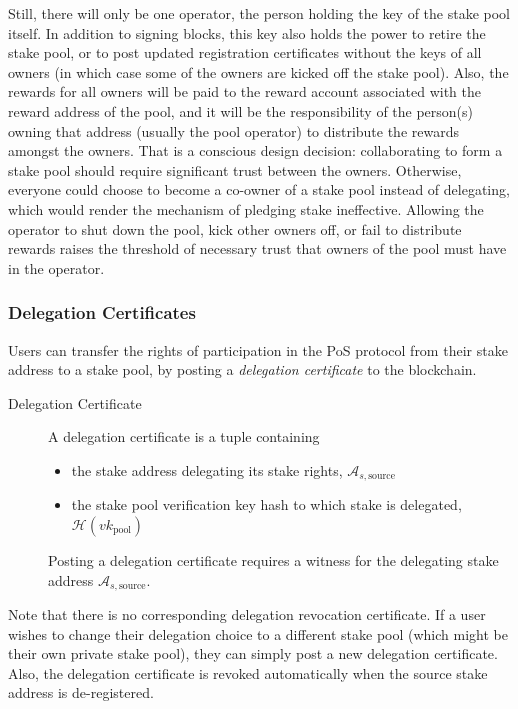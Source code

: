 \documentclass[11pt,a4paper,dvipsnames,twosided]{article}
\begin{document}
Still, there will only be one operator, the person holding the key of the stake
pool itself. In addition to signing blocks, this key also holds the power to
retire the stake pool, or to post updated registration certificates without the
keys of all owners (in which case some of the owners are kicked off the stake
pool). Also, the rewards for all owners will be paid to the reward account
associated with the reward address of the pool, and it will be the
responsibility of the person(s) owning that address (usually the pool operator) to
distribute the rewards amongst the owners.
That is a conscious design decision: collaborating to form a stake pool should
require significant trust between the owners. Otherwise, everyone could choose
to become a co-owner of a stake pool instead of delegating, which would render
the mechanism of pledging stake ineffective. Allowing the operator to shut down
the pool, kick other owners off, or fail to distribute rewards raises the
threshold of necessary trust that owners of the pool must have in the operator.

\subsubsection{Delegation Certificates}
\label{delegation-certificates}

Users can transfer the rights of participation in the PoS protocol from
their stake address to a stake pool, by posting a \emph{delegation
certificate} to the blockchain.

\begin{description}
\item[Delegation Certificate]
A delegation certificate is a tuple containing

\begin{itemize}
\item
  the stake address delegating its stake rights,
  \(\mathcal{A}_{s,\text{source}}\)
\item
  the stake pool verification key hash to which stake is delegated,
  \(\mathcal{H}(vk_\text{pool})\)
\end{itemize}

Posting a delegation certificate requires a witness for the delegating stake
address \(\mathcal{A}_{s,\text{source}}\).
\end{description}

Note that there is no corresponding delegation revocation certificate. If a user
wishes to change their delegation choice to a different stake pool (which might
be their own private stake pool), they can simply post a new delegation
certificate. Also, the delegation certificate is revoked automatically when the
source stake address is de-registered.
\end{document}
